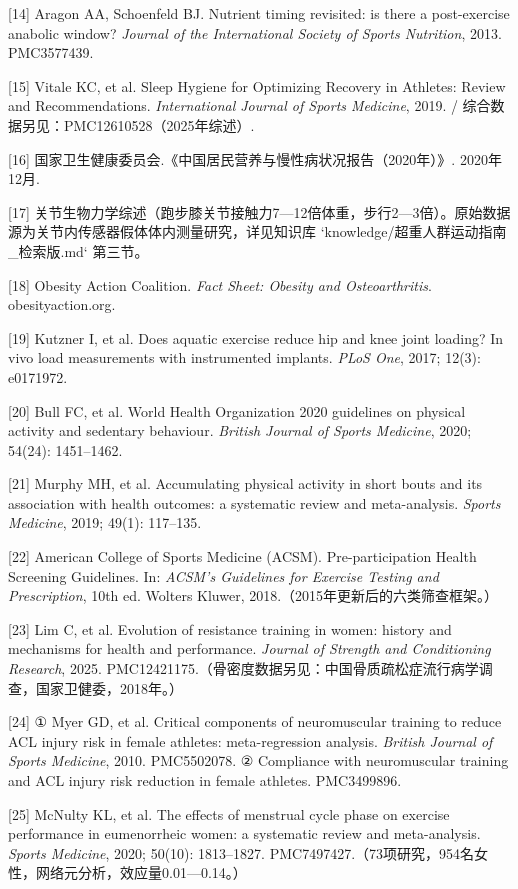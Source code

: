 \documentclass[UTF8,zihao=-4,oneside]{ctexart}
\begin{document}
[14] Aragon AA, Schoenfeld BJ. Nutrient timing revisited: is there a post-exercise anabolic window? \emph{Journal of the International Society of Sports Nutrition}, 2013. PMC3577439.

[15] Vitale KC, et al. Sleep Hygiene for Optimizing Recovery in Athletes: Review and Recommendations. \emph{International Journal of Sports Medicine}, 2019. / 综合数据另见：PMC12610528（2025年综述）.

[16] 国家卫生健康委员会.《中国居民营养与慢性病状况报告（2020年）》. 2020年12月.

[17] 关节生物力学综述（跑步膝关节接触力7—12倍体重，步行2—3倍）。原始数据源为关节内传感器假体体内测量研究，详见知识库 `knowledge/超重人群运动指南\_检索版.md` 第三节。

[18] Obesity Action Coalition. \emph{Fact Sheet: Obesity and Osteoarthritis}. obesityaction.org.

[19] Kutzner I, et al. Does aquatic exercise reduce hip and knee joint loading? In vivo load measurements with instrumented implants. \emph{PLoS One}, 2017; 12(3): e0171972.

[20] Bull FC, et al. World Health Organization 2020 guidelines on physical activity and sedentary behaviour. \emph{British Journal of Sports Medicine}, 2020; 54(24): 1451–1462.

[21] Murphy MH, et al. Accumulating physical activity in short bouts and its association with health outcomes: a systematic review and meta-analysis. \emph{Sports Medicine}, 2019; 49(1): 117–135.

[22] American College of Sports Medicine (ACSM). Pre-participation Health Screening Guidelines. In: \emph{ACSM's Guidelines for Exercise Testing and Prescription}, 10th ed. Wolters Kluwer, 2018.（2015年更新后的六类筛查框架。）

[23] Lim C, et al. Evolution of resistance training in women: history and mechanisms for health and performance. \emph{Journal of Strength and Conditioning Research}, 2025. PMC12421175.（骨密度数据另见：中国骨质疏松症流行病学调查，国家卫健委，2018年。）

[24] ① Myer GD, et al. Critical components of neuromuscular training to reduce ACL injury risk in female athletes: meta-regression analysis. \emph{British Journal of Sports Medicine}, 2010. PMC5502078. ② Compliance with neuromuscular training and ACL injury risk reduction in female athletes. PMC3499896.

[25] McNulty KL, et al. The effects of menstrual cycle phase on exercise performance in eumenorrheic women: a systematic review and meta-analysis. \emph{Sports Medicine}, 2020; 50(10): 1813–1827. PMC7497427.（73项研究，954名女性，网络元分析，效应量0.01—0.14。）
\end{document}
